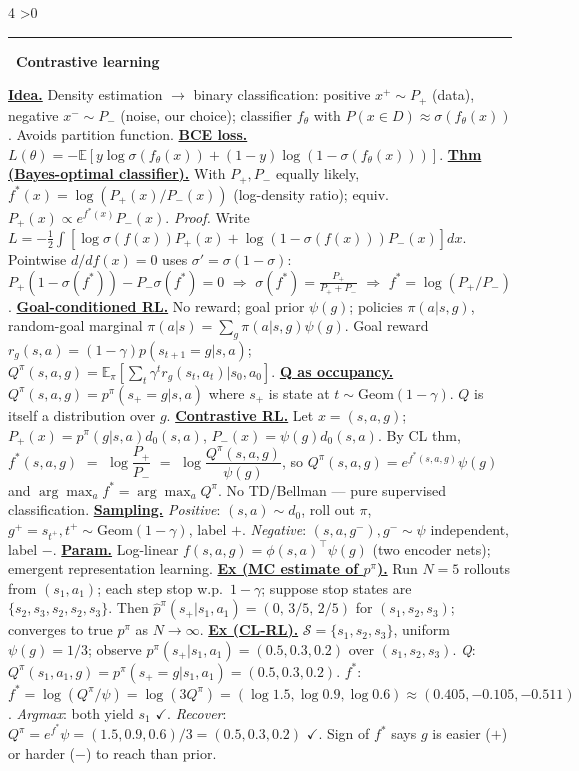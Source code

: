 \documentclass[10pt,landscape,letterpaper]{article}
\let\oldtextbf\textbf
\renewcommand{\textbf}[1]{\uline{\oldtextbf{#1}}}
\renewcommand{\section}[1]{%
  \ifnum\value{section}>0\par\vspace{1pt}\hrule\vspace{1pt}\fi
  \refstepcounter{section}\oldtextbf{\thesection\ #1}\ }
\begin{document}
\begin{multicols*}{4}
\section{Contrastive learning}

\textbf{Idea.} Density estimation \(\to\) binary classification: positive \(x^+\!\sim\!P_+\) (data), negative \(x^-\!\sim\!P_-\) (noise, our choice); classifier \(f_\theta\) with \(P(x{\in}D)\approx\sigma(f_\theta(x))\). Avoids partition function.
\textbf{BCE loss.} \(L(\theta){=}-\mathbb E[y\log\sigma(f_\theta(x))+(1{-}y)\log(1{-}\sigma(f_\theta(x)))]\).
\textbf{Thm (Bayes-optimal classifier).} With \(P_+,P_-\) equally likely, \(f^*(x)=\log(P_+(x)/P_-(x))\) (log-density ratio); equiv.\ \(P_+(x)\propto e^{f^*(x)}P_-(x)\).
\emph{Proof.} Write \(L{=}-\tfrac{1}{2}\!\int\![\log\sigma(f(x))P_+(x)+\log(1{-}\sigma(f(x)))P_-(x)]dx\). Pointwise \(d/df(x){=}0\) uses \(\sigma'{=}\sigma(1{-}\sigma)\): \(P_+(1{-}\sigma(f^*)){-}P_-\sigma(f^*){=}0\) \(\Rightarrow\) \(\sigma(f^*){=}\tfrac{P_+}{P_++P_-}\) \(\Rightarrow\) \(f^*{=}\log(P_+/P_-)\).
\textbf{Goal-conditioned RL.} No reward; goal prior \(\psi(g)\); policies \(\pi(a|s,g)\), random-goal marginal \(\pi(a|s){=}\sum_g\pi(a|s,g)\psi(g)\).
Goal reward \(r_g(s,a){=}(1{-}\gamma)p(s_{t+1}{=}g|s,a)\); \(Q^\pi(s,a,g){=}\mathbb E_\pi[\sum_t\gamma^t r_g(s_t,a_t)|s_0,a_0]\).
\textbf{Q as occupancy.} \(Q^\pi(s,a,g)=p^\pi(s_+{=}g|s,a)\) where \(s_+\) is state at \(t\!\sim\!\mathrm{Geom}(1{-}\gamma)\). \(Q\) is itself a distribution over \(g\).
\textbf{Contrastive RL.} Let \(x{=}(s,a,g)\); \(P_+(x){=}p^\pi(g|s,a)d_0(s,a)\), \(P_-(x){=}\psi(g)d_0(s,a)\). By CL thm, \(f^*(s,a,g)\) \(=\) \(\log\dfrac{P_+}{P_-}\) \(=\) \(\log\dfrac{Q^\pi(s,a,g)}{\psi(g)}\), so \(Q^\pi(s,a,g){=}e^{f^*(s,a,g)}\psi(g)\) and \(\arg\max_a f^*{=}\arg\max_a Q^\pi\). No TD/Bellman — pure supervised classification.
\textbf{Sampling.} \emph{Positive}: \((s,a)\!\sim\!d_0\), roll out \(\pi\), \(g^+{=}s_{t^+},t^+\!\sim\!\mathrm{Geom}(1{-}\gamma)\), label \(+\). \emph{Negative}: \((s,a,g^-),g^-\!\sim\!\psi\) independent, label \(-\).
\textbf{Param.} Log-linear \(f(s,a,g){=}\phi(s,a)^\top\psi(g)\) (two encoder nets); emergent representation learning.
\textbf{Ex (MC estimate of \(p^\pi\)).} Run \(N{=}5\) rollouts from \((s_1,a_1)\); each step stop w.p.\ \(1{-}\gamma\); suppose stop states are \(\{s_2,s_3,s_2,s_2,s_3\}\). Then \(\hat p^\pi(s_+|s_1,a_1){=}(0,\,3/5,\,2/5)\) for \((s_1,s_2,s_3)\); converges to true \(p^\pi\) as \(N{\to}\infty\).
\textbf{Ex (CL-RL).} \(\mathcal S{=}\{s_1,s_2,s_3\}\), uniform \(\psi(g){=}1/3\); observe \(p^\pi(s_+|s_1,a_1){=}(0.5,0.3,0.2)\) over \((s_1,s_2,s_3)\).
\emph{Q}: \(Q^\pi(s_1,a_1,g){=}p^\pi(s_+{=}g|s_1,a_1){=}(0.5,0.3,0.2)\).
\emph{\(f^*\)}: \(f^*{=}\log(Q^\pi/\psi){=}\log(3Q^\pi){=}(\log 1.5,\log 0.9,\log 0.6)\approx(0.405,{-}0.105,{-}0.511)\).
\emph{Argmax}: both yield \(s_1\) \(\checkmark\).
\emph{Recover}: \(Q^\pi{=}e^{f^*}\psi{=}(1.5,0.9,0.6)/3{=}(0.5,0.3,0.2)\) \(\checkmark\). Sign of \(f^*\) says \(g\) is easier (\(+\)) or harder (\(-\)) to reach than prior.


\end{multicols*}
\end{document}

